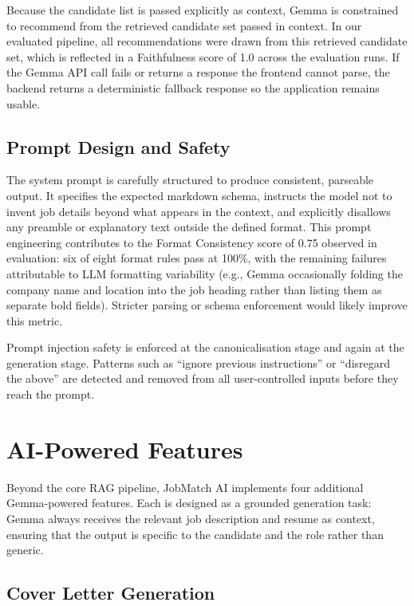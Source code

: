 \documentclass[11pt]{article}
\begin{document}
Because the candidate list is passed explicitly as context, Gemma is constrained to recommend from the retrieved candidate set passed in context. In our evaluated pipeline, all recommendations were drawn from this retrieved candidate set, which is reflected in a Faithfulness score of 1.0 across the evaluation runs. If the Gemma API call fails or returns a response the frontend cannot parse, the backend returns a deterministic fallback response so the application remains usable.

\subsection{Prompt Design and Safety}

The system prompt is carefully structured to produce consistent, parseable output. It specifies the expected markdown schema, instructs the model not to invent job details beyond what appears in the context, and explicitly disallows any preamble or explanatory text outside the defined format. This prompt engineering contributes to the Format Consistency score of 0.75 observed in evaluation: six of eight format rules pass at 100\%, with the remaining failures attributable to LLM formatting variability (e.g., Gemma occasionally folding the company name and location into the job heading rather than listing them as separate bold fields). Stricter parsing or schema enforcement would likely improve this metric.

Prompt injection safety is enforced at the canonicalisation stage and again at the generation stage. Patterns such as ``ignore previous instructions'' or ``disregard the above'' are detected and removed from all user-controlled inputs before they reach the prompt.

\section{AI-Powered Features}

Beyond the core RAG pipeline, JobMatch AI implements four additional Gemma-powered features. Each is designed as a grounded generation task: Gemma always receives the relevant job description and resume as context, ensuring that the output is specific to the candidate and the role rather than generic.

\subsection{Cover Letter Generation}
\end{document}
